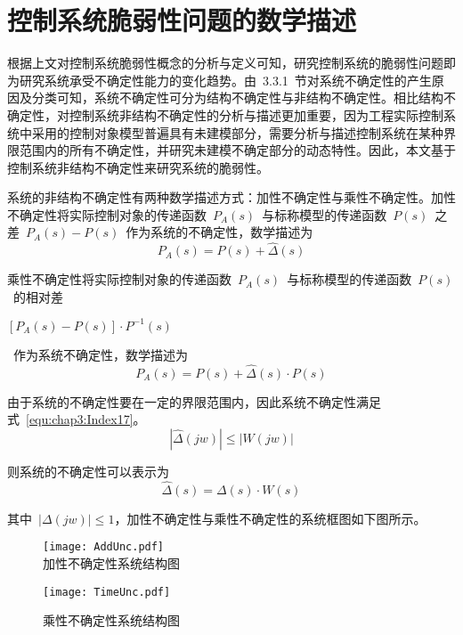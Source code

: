 \section{控制系统脆弱性问题的数学描述}
\label{sec:chap3:Fragility_Math}
根据上文对控制系统脆弱性概念的分析与定义可知，研究控制系统的脆弱性问题即为研究系统承受不确定性能力的变化趋势。由~3.3.1~节对系统不确定性的产生原因及分类可知，系统不确定性可分为结构不确定性与非结构不确定性。相比结构不确定性，对控制系统非结构不确定性的分析与描述更加重要，因为工程实际控制系统中采用的控制对象模型普遍具有未建模部分，需要分析与描述控制系统在某种界限范围内的所有不确定性，并研究未建模不确定部分的动态特性。因此，本文基于控制系统非结构不确定性来研究系统的脆弱性。

系统的非结构不确定性有两种数学描述方式：加性不确定性与乘性不确定性。加性不确定性将实际控制对象的传递函数~$P_A\left(s\right)$~与标称模型的传递函数~$P\left(s\right)$~之差~$P_A\left(s\right)-P\left(s\right)$~作为系统的不确定性，数学描述为
\begin{equation}\label{equ:chap3:Index15}
  P_A\left(s\right)=P\left(s\right)+\hat{\Delta} \left(s\right)
\end{equation}

乘性不确定性将实际控制对象的传递函数~$P_A\left(s\right)$~与标称模型的传递函数~$P\left(s\right)$~的相对差~\begin{small}$\left[P_A\left(s\right)-P\left(s\right)\right]\cdot P^{-1}\left(s\right)$\end{small}~作为系统不确定性，数学描述为
\begin{equation}\label{equ:chap3:Index16}
  P_A\left(s\right)=P\left(s\right)+\hat{\Delta} \left(s\right)\cdot P\left(s\right)
\end{equation}

由于系统的不确定性要在一定的界限范围内，因此系统不确定性满足式~\ref{equ:chap3:Index17}。
\begin{equation}\label{equ:chap3:Index17}
 \left\vert\hat{\Delta}\left(jw\right)\right\vert\leq \left\vert W\left(jw\right)\right\vert
\end{equation}

则系统的不确定性可以表示为
\begin{equation}\label{equ:chap3:Index18}
\hat{\Delta}\left(s\right)=\Delta\left(s\right)\cdot W\left(s\right)
\end{equation}

其中~$\left\vert\Delta\left(jw\right)\right\vert\leq 1$，加性不确定性与乘性不确定性的系统框图如下图所示。
\begin{figure}[h]
\begin{minipage}[t]{0.5\linewidth}
  \centering
  \texttt{[image: AddUnc.pdf]}\\
  \caption{加性不确定性系统结构图}\label{fig:chap3:addunc}
\end{minipage}
\begin{minipage}[t]{0.5\linewidth}
  \centering
  \texttt{[image: TimeUnc.pdf]}\\
  \caption{乘性不确定性系统结构图}\label{fig:chap3:timeunc}
\end{minipage}
\end{figure}

